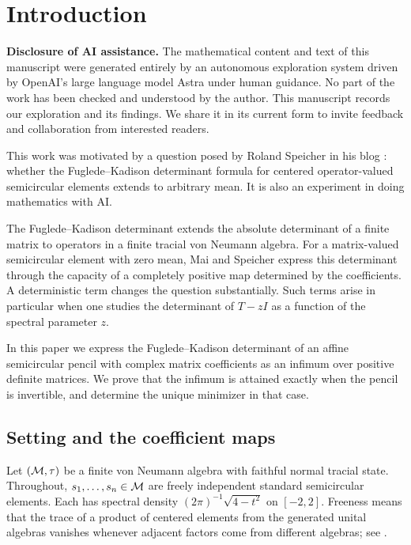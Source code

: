 \section{Introduction}\label{sec:introduction}

\noindent\textbf{Disclosure of AI assistance.}
The mathematical content and text of this manuscript were generated entirely by an autonomous exploration system driven by OpenAI's large language model Astra under human guidance.
No part of the work has been checked and understood by the author.
This manuscript records our exploration and its findings.
We share it in its current form to invite feedback and collaboration from interested readers.
\medskip

This work was motivated by a question posed by Roland Speicher in his blog \cite{Spe26}: whether the Fuglede--Kadison determinant formula for centered operator-valued semicircular elements extends to arbitrary mean.
It is also an experiment in doing mathematics with AI.
\medskip

The Fuglede--Kadison determinant extends the absolute determinant of a finite matrix to operators in a finite tracial von Neumann algebra.
For a matrix-valued semicircular element with zero mean, Mai and Speicher \cite[Theorem 1.2]{MS24} express this determinant through the capacity of a completely positive map determined by the coefficients.
A deterministic term changes the question substantially.
Such terms arise in particular when one studies the determinant of $T-zI$ as a function of the spectral parameter $z$.

In this paper we express the Fuglede--Kadison determinant of an affine semicircular pencil with complex matrix coefficients as an infimum over positive definite matrices.
We prove that the infimum is attained exactly when the pencil is invertible, and determine the unique minimizer in that case.

\subsection{Setting and the coefficient maps}
Let $(\mathcal M,\tau)$ be a finite von Neumann algebra with faithful normal tracial state.
Throughout, $s_1,\ldots,s_n\in\mathcal M$ are freely independent standard semicircular elements.
Each has spectral density $(2\pi)^{-1}\sqrt{4-t^2}$ on $[-2,2]$.
Freeness means that the trace of a product of centered elements from the generated unital algebras vanishes whenever adjacent factors come from different algebras;
see \cite[Section 1.11 and Chapter 2, Section 2]{MS17}.

